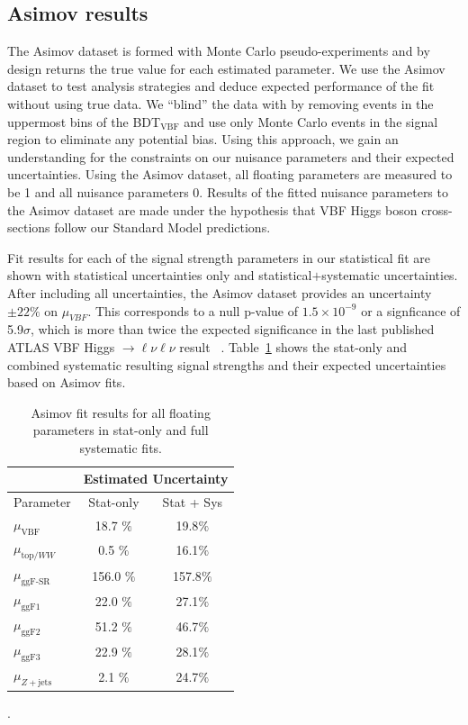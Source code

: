 \subsection{Asimov results}
The Asimov dataset is formed with Monte Carlo pseudo-experiments and by design returns the true value for each estimated parameter. We use the Asimov dataset to test analysis strategies and deduce expected performance of the fit without using true data. We ``blind'' the data with by removing events in the uppermost bins of the BDT$_{\text{VBF}}$ and use only Monte Carlo events in the signal region to eliminate any potential bias. Using this approach, we gain an understanding for the constraints on our nuisance parameters and their expected uncertainties. Using the Asimov dataset, all floating parameters are measured to be 1 and all nuisance parameters 0. Results of the fitted nuisance parameters to the Asimov dataset are made under the hypothesis that VBF Higgs boson cross-sections follow our Standard Model predictions. 

Fit results for each of the signal strength parameters in our statistical fit are shown with statistical uncertainties only and statistical$+$systematic uncertainties. After including all uncertainties, the Asimov dataset provides an uncertainty $\pm22\%$ on $\mu_{VBF}$. This corresponds to a null p-value of $1.5\times10^{-9}$ or a signficance of 5.9$\sigma$, which is more than twice the expected significance in the last published ATLAS VBF Higgs $\rightarrow \ell\nu\ell\nu$ result ~\cite{Aaboud_2019}. Table~\ref{tab:muresults} shows the stat-only and combined systematic resulting signal strengths and their expected uncertainties based on Asimov fits. 

\begin{table}[!h]
  \begin{center}
    \begin{tabular}{l|c|c|}
	& \multicolumn{2}{|c|}{Estimated Uncertainty}\\
       \hline
        Parameter & Stat-only    & Stat + Sys \\
      \hline
       $\mu_{\text{VBF}}$ & 18.7 $\%$ & 19.8$\%$ \\
       $\mu_{\text{top/}WW}$ & 0.5 $\%$ & 16.1$\%$\\
       $\mu_{\text{ggF-SR}}$ & 156.0 $\%$ & 157.8$\%$ \\
       $\mu_{\text{ggF1}}$ & 22.0 $\%$ & 27.1$\%$ \\
       $\mu_{\text{ggF2}}$ & 51.2 $\%$ & 46.7$\%$ \\
       $\mu_{\text{ggF3}}$ & 22.9 $\%$ & 28.1$\%$ \\
       $\mu_{Z+\text{jets}}$ & 2.1 $\%$ & 24.7$\%$ \\
    \end{tabular}
    \caption{Asimov fit results for all floating parameters in stat-only and full systematic fits.}.
    \label{tab:muresults}
  \end{center}
\end{table}

